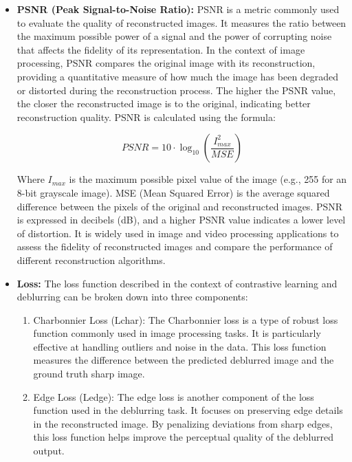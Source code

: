 \documentclass[12pt, a4paper, twoside]{article}
\begin{document}
		\begin{itemize}
			\item \textbf{PSNR (Peak Signal-to-Noise Ratio):} PSNR is a metric commonly used to evaluate the quality of reconstructed images. It measures the ratio between the maximum possible power of a signal and the power of corrupting noise that affects the fidelity of its representation. In the context of image processing, PSNR compares the original image with its reconstruction, providing a quantitative measure of how much the image has been degraded or distorted during the reconstruction process. The higher the PSNR value, the closer the reconstructed image is to the original, indicating better reconstruction quality. PSNR is calculated using the formula:
			
			\begin{equation}
				PSNR = 10 \cdot	\log_{10} \left(\frac{I_{max}^2}{MSE}\right)
			\end{equation}
			
			Where $I_{max}$ is the maximum possible pixel value of the image (e.g., 255 for an 8-bit grayscale image). MSE (Mean Squared Error) is the average squared difference between the pixels of the original and reconstructed images. PSNR is expressed in decibels (dB), and a higher PSNR value indicates a lower level of distortion. It is widely used in image and video processing applications to assess the fidelity of reconstructed images and compare the performance of different reconstruction algorithms.
			
			\item \textbf{Loss:} The loss function described in the context of contrastive learning and deblurring can be broken down into three components:
			
			\begin{enumerate}
				\item Charbonnier Loss (Lchar): The Charbonnier loss is a type of robust loss function commonly used in image processing tasks. It is particularly effective at handling outliers and noise in the data. This loss function measures the difference between the predicted deblurred image and the ground truth sharp image.
				
				\item Edge Loss (Ledge): The edge loss is another component of the loss function used in the deblurring task. It focuses on preserving edge details in the reconstructed image. By penalizing deviations from sharp edges, this loss function helps improve the perceptual quality of the deblurred output.
				

\end{enumerate}
\end{itemize}
\end{document}
